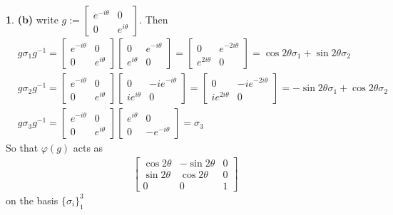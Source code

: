 \documentclass[10.5pt]{article}
\theoremstyle{definition}
\newtheorem{pb}{}
\newcommand{\set}[1]{\{#1\}}
\begin{document}
\begin{pb}
        \textbf{(b)} write \(g := \begin{bmatrix} e^{-i\theta} & 0 \\ 0 & e^{i\theta} \end{bmatrix}\). Then
        \begin{align*}
            &g\sigma_1g^{-1} = \begin{bmatrix} e^{-i\theta} & 0 \\ 0 & e^{i\theta} \end{bmatrix}\begin{bmatrix} 0 & e^{-i\theta} \\ e^{i\theta} & 0 \end{bmatrix}
            = \begin{bmatrix} 0 & e^{-2i\theta} \\  e^{2i\theta} & 0 \end{bmatrix} = \cos2\theta \sigma_1 + \sin2\theta \sigma_2 \\
            &g\sigma_2g^{-1} = \begin{bmatrix} e^{-i\theta} & 0 \\ 0 & e^{i\theta} \end{bmatrix}\begin{bmatrix} 0 & -ie^{-i\theta} \\ ie^{i\theta} & 0 \end{bmatrix}
            = \begin{bmatrix} 0 & -ie^{-2i\theta} \\  ie^{2i\theta} & 0 \end{bmatrix} = -\sin2\theta \sigma_1 + \cos 2\theta \sigma_2\\
            &g\sigma_3g^{-1} = \begin{bmatrix} e^{-i\theta} & 0 \\ 0 & e^{i\theta} \end{bmatrix}\begin{bmatrix} e^{i\theta} & 0 \\ 0 & -e^{-i\theta} \end{bmatrix} = \sigma_3
        \end{align*}
        So that \(\varphi(g)\) acts as
        \begin{align*}
            \begin{bmatrix} \cos2\theta & -\sin2\theta & 0 \\ \sin2\theta & \cos2\theta & 0 \\ 0 & 0 & 1 \end{bmatrix}
        \end{align*}
        on the basis \(\set{\sigma_i}_1^3\)


\end{pb}
\end{document}

